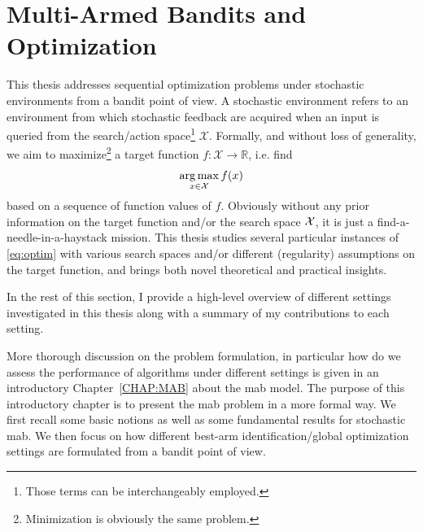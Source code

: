 \section{Multi-Armed Bandits and Optimization}\label{sec:intro.mab}
    
This thesis addresses sequential optimization problems under stochastic environments from a bandit point of view. A stochastic environment refers to an environment from which stochastic feedback are acquired when an input is queried from the search/action space\footnote{Those terms can be interchangeably employed.} $\mathcal{X}$. Formally, and without loss of generality, we aim to maximize\footnote{Minimization is obviously the same problem.} a target function $f:\mathcal{X}\rightarrow\mathbb{R}$, i.e. find 
\begin{equation}\label{eq:optim}
    \operatorname*{arg\,max}_{x\in\mathcal{X}} f(x)
\end{equation}
based on a sequence of function values of $f$. Obviously without any prior information on the target function and/or the search space $\mathcal{X}$, it is just a find-a-needle-in-a-haystack mission. This thesis studies several particular instances of \eqref{eq:optim} with various search spaces and/or different (regularity) assumptions on the target function, and brings both novel theoretical and practical insights. 

In the rest of this section, I provide a high-level overview of different settings investigated in this thesis along with a summary of my contributions to each setting.

More thorough discussion on the problem formulation, in particular how do we assess the performance of algorithms under different settings is given in an introductory Chapter~\ref{CHAP:MAB} about the \gls{mab} model. The purpose of this introductory chapter is to present the \gls{mab} problem in a more formal way. We first recall some basic notions as well as some fundamental results for stochastic \gls{mab}. We then focus on how different best-arm identification/global optimization settings are formulated from a bandit point of view.


